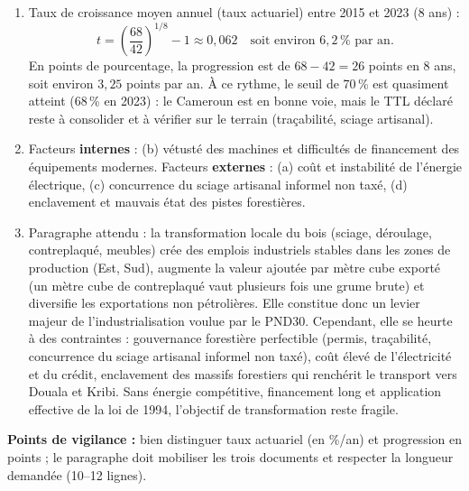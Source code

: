 \documentclass[11pt]{article}
\begin{document}
\begin{corrige}
\begin{enumerate}
    \item Taux de croissance moyen annuel (taux actuariel) entre 2015 et 2023 (8 ans) :
    \[ t = \left(\frac{68}{42}\right)^{1/8} - 1 \approx 0{,}062 \quad \text{soit environ } 6{,}2\,\% \text{ par an.} \]
    En points de pourcentage, la progression est de $68 - 42 = 26$ points en 8 ans, soit environ $3{,}25$ points par an. À ce rythme, le seuil de 70\,\% est quasiment atteint (68\,\% en 2023) : le Cameroun est en bonne voie, mais le TTL déclaré reste à consolider et à vérifier sur le terrain (traçabilité, sciage artisanal).
    \item Facteurs \textbf{internes} : (b) vétusté des machines et difficultés de financement des équipements modernes. Facteurs \textbf{externes} : (a) coût et instabilité de l'énergie électrique, (c) concurrence du sciage artisanal informel non taxé, (d) enclavement et mauvais état des pistes forestières.
    \item Paragraphe attendu : la transformation locale du bois (sciage, déroulage, contreplaqué, meubles) crée des emplois industriels stables dans les zones de production (Est, Sud), augmente la valeur ajoutée par mètre cube exporté (un mètre cube de contreplaqué vaut plusieurs fois une grume brute) et diversifie les exportations non pétrolières. Elle constitue donc un levier majeur de l'industrialisation voulue par le PND30. Cependant, elle se heurte à des contraintes : gouvernance forestière perfectible (permis, traçabilité, concurrence du sciage artisanal informel non taxé), coût élevé de l'électricité et du crédit, enclavement des massifs forestiers qui renchérit le transport vers Douala et Kribi. Sans énergie compétitive, financement long et application effective de la loi de 1994, l'objectif de transformation reste fragile.
\end{enumerate}
\textbf{Points de vigilance :} bien distinguer taux actuariel (en \%/an) et progression en points ; le paragraphe doit mobiliser les trois documents et respecter la longueur demandée (10--12 lignes).
\end{corrige}
\end{document}
